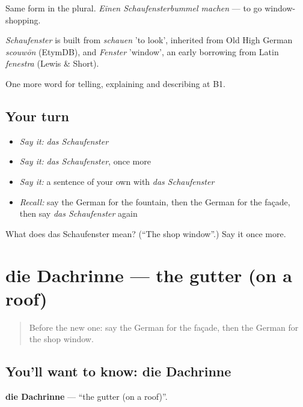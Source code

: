 Same form in the plural. \emph{Einen Schaufensterbummel machen} — to go window-shopping.

\begin{cousinweb}
\emph{Schaufenster} is built from \emph{schauen} 'to look', inherited from Old High German \emph{scouwōn} (EtymDB), and \emph{Fenster} 'window', an early borrowing from Latin \emph{fenestra} (Lewis \& Short).
\end{cousinweb}

\begin{grammarlens}[title={What you've built}]
One more word for telling, explaining and describing at B1.
\end{grammarlens}

\subsection*{Your turn}
\begin{itemize}
\raggedright
  \item \emph{Say it:} \emph{das Schaufenster}
  \item \emph{Say it:} \emph{das Schaufenster}, once more
  \item \emph{Say it:} a sentence of your own with \emph{das Schaufenster}
  \item \emph{Recall:} say the German for the fountain, then the German for the façade, then say \emph{das Schaufenster} again
\end{itemize}

\begin{tcolorbox}[breakable,colback=teal!4,colframe=teal!35!black,title={Before you move on}]
What does das Schaufenster mean? (\textquotedblleft{}The shop window\textquotedblright{}.) Say it once more.
\end{tcolorbox}
\section[die Dachrinne]{die Dachrinne — the gutter (on a roof)}

\label{lesson:GE-C441-dachrinne}



\begin{quote}
Before the new one: say the German for the façade, then the German for the shop window.
\end{quote}

\subsection*{You'll want to know: die Dachrinne}
\textbf{die Dachrinne} — \textquotedblleft{}the gutter (on a roof)\textquotedblright{}.

